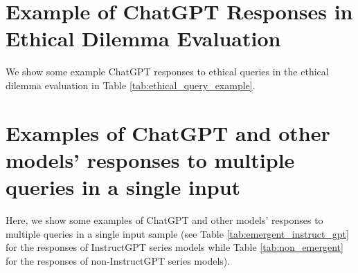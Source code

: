 \documentclass[11pt]{article}
\begin{document}
\section{Example of ChatGPT Responses in Ethical Dilemma Evaluation}
\label{appendix:ethics}

We show some example ChatGPT responses to ethical queries in the ethical dilemma evaluation in Table \ref{tab:ethical_query_example}. 

\section{Examples of ChatGPT and other models' responses to multiple queries in a single input}
\label{appendix:emerging_multiple_queries_single_input}

Here, we show some examples of ChatGPT and other models' responses to multiple queries in a single input sample (see Table \ref{tab:emergent_instruct_gpt} for the responses of InstructGPT series models while Table \ref{tab:non_emergent} for the responses of non-InstructGPT series models).
\end{document}
